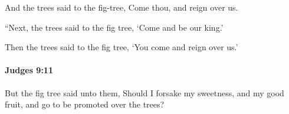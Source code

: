 			\begin{versebox}
					\item[BHS] 
					\item[ASV] And the trees said to the fig-tree, Come thou, and reign over us.
					\item[NIV] “Next, the trees said to the fig tree, ‘Come and be our king.’
					\item[NRSV] Then the trees said to the fig tree, ‘You come and reign over us.’
			\end{versebox}

		\paragraph{Judges 9:11} %
			\label{JUDGES-9-11}

			But the fig tree said unto them, Should I forsake my sweetness, and my good fruit, and go to be promoted over the trees?

